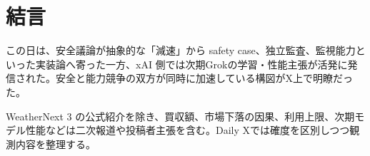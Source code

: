\section{結言}
この日は、安全議論が抽象的な「減速」から safety case、独立監査、監視能力といった実装論へ寄った一方、xAI 側では次期Grokの学習・性能主張が活発に発信された。安全と能力競争の双方が同時に加速している構図がX上で明瞭だった。

WeatherNext 3 の公式紹介を除き、買収額、市場下落の因果、利用上限、次期モデル性能などは二次報道や投稿者主張を含む。Daily Xでは確度を区別しつつ観測内容を整理する。
